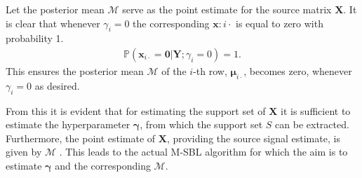 Let the posterior mean $\mathcal{M}$ serve as the point estimate for the source matrix $\mathbf{X}$.
It is clear that whenever $\gamma_i = 0$ the corresponding $\textbf{x}:{i\cdot}$ is equal to zero with probability 1.
\begin{align*}
\mathbb{P}(\mathbf{x}_{i \cdot} = \mathbf{0} \vert \mathbf{Y} ; \gamma_i = 0) = 1.
\end{align*}
This ensures the posterior mean $\mathcal{M}$ of the $i$-th row, $\boldsymbol{\mu}_{i \cdot}$, becomes zero, whenever $\gamma_i = 0$ as desired.

From this it is evident that for estimating the support set of $\mathbf{X}$ it is sufficient to estimate the hyperparameter $\boldsymbol{\gamma}$, from which the support set $S$ can be extracted. Furthermore, the point estimate of $\mathbf{X}$, providing the source signal estimate, is given by $\mathcal{M}$ \cite[p. 147]{phd_wipf}. 
This leads to the actual M-SBL algorithm for which the aim is to estimate $\boldsymbol{\gamma}$ and the corresponding $\mathcal{M}$.

